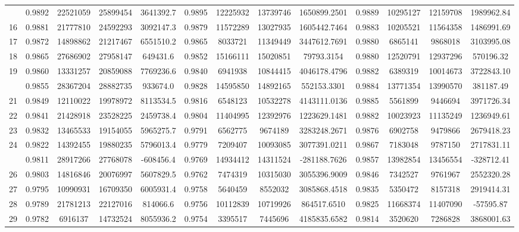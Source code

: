 \documentclass[
  12pt,
]{article}
\begin{document}
\begin{longtable}[t]{lcccccccccccc}
\addlinespace
15 & 0.9892 & 22521059 & 25899454 & 3641392.7 & 0.9895 & 12225932 & 13739746 & 1650899.2501 & 0.9889 & 10295127 & 12159708 & 1989962.84\\
16 & 0.9881 & 21777810 & 24592293 & 3092147.3 & 0.9879 & 11572289 & 13027935 & 1605442.7464 & 0.9883 & 10205521 & 11564358 & 1486991.69\\
17 & 0.9872 & 14898862 & 21217467 & 6551510.2 & 0.9865 & 8033721 & 11349449 & 3447612.7691 & 0.9880 & 6865141 & 9868018 & 3103995.08\\
18 & 0.9865 & 27686902 & 27958147 & 649431.6 & 0.9852 & 15166111 & 15020851 & 79793.3154 & 0.9880 & 12520791 & 12937296 & 570196.32\\
19 & 0.9860 & 13331257 & 20859088 & 7769236.6 & 0.9840 & 6941938 & 10844415 & 4046178.4796 & 0.9882 & 6389319 & 10014673 & 3722843.10\\
\addlinespace
20 & 0.9855 & 28367204 & 28882735 & 933674.0 & 0.9828 & 14595850 & 14892165 & 552153.3301 & 0.9884 & 13771354 & 13990570 & 381187.49\\
21 & 0.9849 & 12110022 & 19978972 & 8113534.5 & 0.9816 & 6548123 & 10532278 & 4143111.0136 & 0.9885 & 5561899 & 9446694 & 3971726.34\\
22 & 0.9841 & 21428918 & 23528225 & 2459738.4 & 0.9804 & 11404995 & 12392976 & 1223629.1481 & 0.9882 & 10023923 & 11135249 & 1236949.61\\
23 & 0.9832 & 13465533 & 19154055 & 5965275.7 & 0.9791 & 6562775 & 9674189 & 3283248.2671 & 0.9876 & 6902758 & 9479866 & 2679418.23\\
24 & 0.9822 & 14392455 & 19880235 & 5796013.4 & 0.9779 & 7209407 & 10093085 & 3077391.0211 & 0.9867 & 7183048 & 9787150 & 2717831.11\\
\addlinespace
25 & 0.9811 & 28917266 & 27768078 & -608456.4 & 0.9769 & 14934412 & 14311524 & -281188.7626 & 0.9857 & 13982854 & 13456554 & -328712.41\\
26 & 0.9803 & 14816846 & 20076997 & 5607829.5 & 0.9762 & 7474319 & 10315030 & 3055396.9009 & 0.9846 & 7342527 & 9761967 & 2552320.28\\
27 & 0.9795 & 10990931 & 16709350 & 6005931.4 & 0.9758 & 5640459 & 8552032 & 3085868.4518 & 0.9835 & 5350472 & 8157318 & 2919414.31\\
28 & 0.9789 & 21781213 & 22127016 & 814066.6 & 0.9756 & 10112839 & 10719926 & 864517.6510 & 0.9825 & 11668374 & 11407090 & -57595.87\\
29 & 0.9782 & 6916137 & 14732524 & 8055936.2 & 0.9754 & 3395517 & 7445696 & 4185835.6582 & 0.9814 & 3520620 & 7286828 & 3868001.63\\

\end{longtable}
\end{document}
